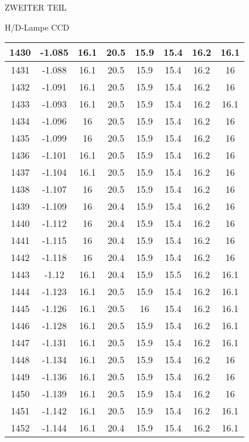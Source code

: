 \begin{appendix}
\begin{chapter}{ZWEITER TEIL}
\begin{section}{H/D-Lampe CCD}
\begin{scriptsize}
\begin{longtable}[htbp]{|c|c|c|c|c|c|c|c|}
            1430 & -1.085 & 16.1 & 20.5 & 15.9 & 15.4 & 16.2 & 16.1 \\ \hline
            1431 & -1.088 & 16.1 & 20.5 & 15.9 & 15.4 & 16.2 & 16 \\ \hline
            1432 & -1.091 & 16.1 & 20.5 & 15.9 & 15.4 & 16.2 & 16 \\ \hline
            1433 & -1.093 & 16.1 & 20.5 & 15.9 & 15.4 & 16.2 & 16.1 \\ \hline
            1434 & -1.096 & 16 & 20.5 & 15.9 & 15.4 & 16.2 & 16 \\ \hline
            1435 & -1.099 & 16 & 20.5 & 15.9 & 15.4 & 16.2 & 16 \\ \hline
            1436 & -1.101 & 16.1 & 20.5 & 15.9 & 15.4 & 16.2 & 16 \\ \hline
            1437 & -1.104 & 16.1 & 20.5 & 15.9 & 15.4 & 16.2 & 16 \\ \hline
            1438 & -1.107 & 16 & 20.5 & 15.9 & 15.4 & 16.2 & 16 \\ \hline
            1439 & -1.109 & 16 & 20.4 & 15.9 & 15.4 & 16.2 & 16 \\ \hline
            1440 & -1.112 & 16 & 20.4 & 15.9 & 15.4 & 16.2 & 16 \\ \hline
            1441 & -1.115 & 16 & 20.4 & 15.9 & 15.4 & 16.2 & 16 \\ \hline
            1442 & -1.118 & 16 & 20.4 & 15.9 & 15.4 & 16.2 & 16 \\ \hline
            1443 & -1.12 & 16.1 & 20.4 & 15.9 & 15.5 & 16.2 & 16.1 \\ \hline
            1444 & -1.123 & 16.1 & 20.5 & 15.9 & 15.4 & 16.2 & 16.1 \\ \hline
            1445 & -1.126 & 16.1 & 20.5 & 16 & 15.4 & 16.2 & 16.1 \\ \hline
            1446 & -1.128 & 16.1 & 20.5 & 15.9 & 15.4 & 16.2 & 16.1 \\ \hline
            1447 & -1.131 & 16.1 & 20.5 & 15.9 & 15.4 & 16.2 & 16.1 \\ \hline
            1448 & -1.134 & 16.1 & 20.5 & 15.9 & 15.4 & 16.2 & 16 \\ \hline
            1449 & -1.136 & 16.1 & 20.5 & 15.9 & 15.4 & 16.2 & 16 \\ \hline
            1450 & -1.139 & 16.1 & 20.5 & 15.9 & 15.4 & 16.2 & 16 \\ \hline
            1451 & -1.142 & 16.1 & 20.5 & 15.9 & 15.4 & 16.2 & 16.1 \\ \hline
            1452 & -1.144 & 16.1 & 20.4 & 15.9 & 15.4 & 16.2 & 16.1 \\ \hline

\end{longtable}
\end{scriptsize}
\end{section}
\end{chapter}
\end{appendix}
